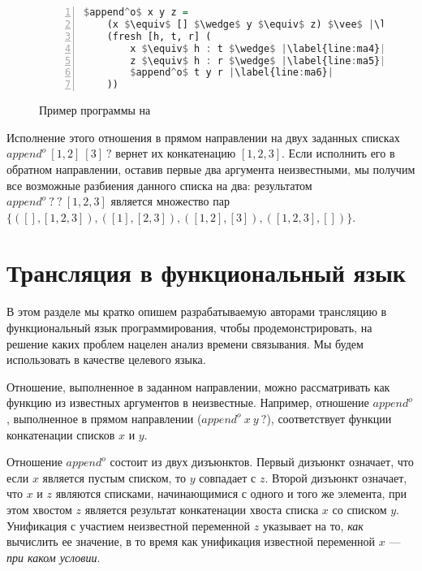 \documentclass[conference,american,russian]{IEEEtran}
\begin{document}
\begin{figure}[h!]
  \begin{center}
  \begin{minipage}{0.3\textwidth}
  \begin{lstlisting}[language=Haskell, frame=single, numbers=left,numberstyle=\small, escapechar=|]
  $append^o$ x y z =
    (x $\equiv$ [] $\wedge$ y $\equiv$ z) $\vee$ |\label{line:ma2}|
    (fresh [h, t, r] (
        x $\equiv$ h : t $\wedge$ |\label{line:ma4}|
        z $\equiv$ h : r $\wedge$ |\label{line:ma5}|
        $append^o$ t y r |\label{line:ma6}|
    ))
    \end{lstlisting}
  \end{minipage}
  \end{center}
  \caption{Пример программы на \miniKanren{}}
  \label{lst:appendoDEF}
\end{figure}

Исполнение этого отношения в прямом направлении на двух заданных списках $append^o \ [1,2] \ [3] \ ?$ вернет их конкатенацию $[1,2,3]$.
Если исполнить его в обратном направлении, оставив первые два аргумента неизвестными, мы получим все возможные разбиения данного списка на два: результатом $append^o \ ? \ ? \ [1,2,3]$ является множество пар $\{([],[1,2,3]), ([1], [2,3]), ([1,2], [3]), ([1,2,3], [])\}$.

\section{Трансляция в функциональный язык}\label{translator}

В этом разделе мы кратко опишем разрабатываемую авторами трансляцию \miniKanren{} в функциональный язык программирования, чтобы продемонстрировать, на решение каких проблем нацелен анализ времени связывания.
Мы будем использовать \haskell{} в качестве целевого языка. 

Отношение, выполненное в заданном направлении, можно рассматривать как функцию из известных аргументов в неизвестные. 
Например, отношение $append^o$, выполненное в прямом направлении ($append^o \ x \ y \ ?$), соответствует функции конкатенации списков $x$ и $y$. 

Отношение $append^o$ состоит из двух дизъюнктов. 
Первый дизъюнкт означает, что если $x$ является пустым списком, то $y$ совпадает с $z$. 
Второй дизъюнкт означает, что $x$ и $z$ являются списками, начинающимися с одного и того же элемента, при этом хвостом $z$ является результат конкатенации хвоста списка $x$ со списком $y$. 
Унификация с участием неизвестной переменной $z$ указывает на то, \emph{как} вычислить ее значение, в то время как унификация  известной переменной $x$ --- \emph{при каком условии}.
\end{document}
